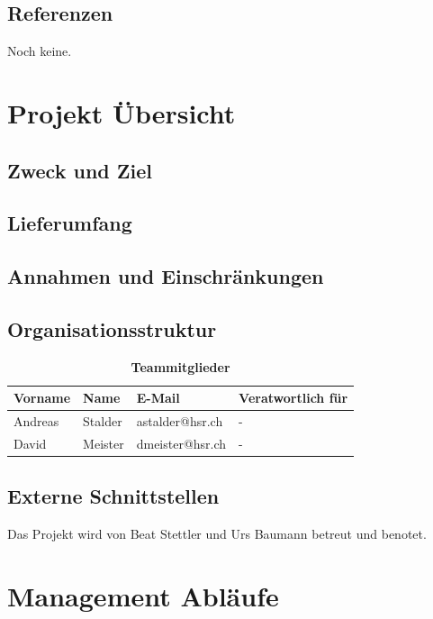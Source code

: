 \documentclass[a4,12pt]{scrartcl}
\begin{document}
\subsection{Referenzen}
\begin{description}
Noch keine.
\end{description}

\section{Projekt Übersicht}

\subsection{Zweck und Ziel}

\subsection{Lieferumfang}

\subsection{Annahmen und Einschränkungen}

\subsection{Organisationsstruktur}
\begin{table}[H]
\centering
    \begin{tabular}{@{} l l l l@{}}    
    {Vorname} & {Name} & {E-Mail} & Veratwortlich für\\ \midrule
    Andreas & Stalder & astalder@hsr.ch & -\\ \addlinespace
    David & Meister & dmeister@hsr.ch & -\\ \bottomrule
    \end{tabular}
\caption{\textbf{Teammitglieder}}
\end{table} 

\subsection{Externe Schnittstellen}
Das Projekt wird von Beat Stettler und Urs Baumann betreut und benotet.

\section{Management Abläufe}
\end{document}
